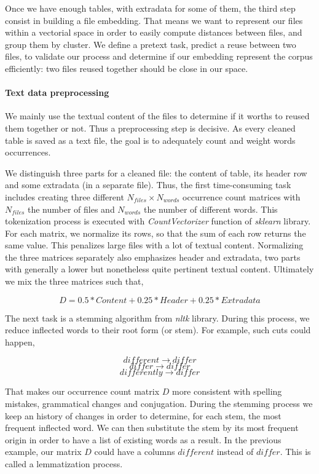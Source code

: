 \documentclass[a4paper]{article}
\begin{document}
	Once we have enough tables, with extradata for some of them, the third step consist in building a file embedding. That means we want to represent our files within a vectorial space in order to easily compute distances between files, and group them by cluster. We define a pretext task, predict a reuse between two files, to validate our process and determine if our embedding represent the corpus efficiently: two files reused together should be close in our space. 
	
	\paragraph{Text data preprocessing}
	
	We mainly use the textual content of the files to determine if it worths to reused them together or not. Thus a preprocessing step is decisive. As every cleaned table is saved as a text file, the goal is to adequately count and weight words occurrences. 
	
	We distinguish three parts for a cleaned file: the content of table, its header row and some extradata (in a separate file). Thus, the first time-consuming task includes creating three different $N_{files} \times N_{words}$ occurrence count matrices with $N_{files}$ the number of files and $N_{words}$ the number of different words. This tokenization process is executed with \emph{CountVectorizer} function of \emph{sklearn} library. For each matrix, we normalize its rows, so that the sum of each row returns the same value. This penalizes large files with a lot of textual content. Normalizing the three matrices separately also emphasizes header and extradata, two parts with generally a lower but nonetheless quite pertinent textual content. Ultimately we mix the three matrices such that,
	
	\begin{equation}
		D = 0.5 * Content + 0.25 * Header + 0.25 * Extradata		
	\end{equation}
	
	The next task is a stemming algorithm from \emph{nltk} library. During this process, we reduce inflected words to their root form (or stem). For example, such cuts could happen,
	
	\[
		different \rightarrow differ
	\]
	\[
		differ \rightarrow differ
	\]
	\[
		differently \rightarrow differ
	\]

	That makes our occurrence count matrix $D$ more consistent with spelling mistakes, grammatical changes and conjugation. During the stemming process we keep an history of changes in order to determine, for each stem, the most frequent inflected word. We can then substitute the stem by its most frequent origin in order to have a list of existing words as a result. In the previous example, our matrix $D$ could have a columns $different$ instead of $differ$. This is called a lemmatization process.
	
\end{document}
